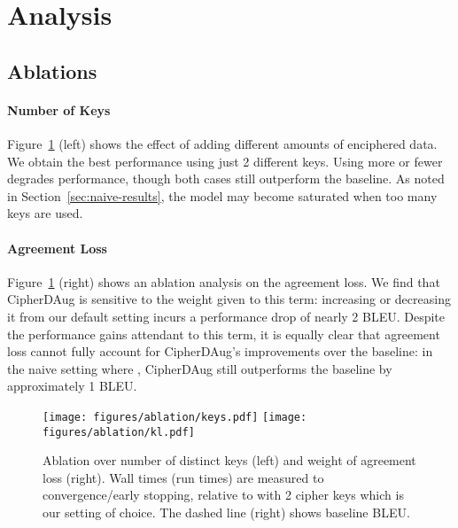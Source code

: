 \documentclass[11pt]{article}
\begin{document}
\section{Analysis}


\subsection{Ablations} 

\label{sec:ablation}
\paragraph{Number of Keys} Figure~\ref{fig:agreement-ablation} (left) shows the effect of adding different amounts of enciphered data. We obtain the best performance using just 2 different keys. Using more or fewer degrades performance, though both cases still outperform the baseline. 
As noted in Section~\ref{sec:naive-results}, the model may become saturated when too many keys are used.

\paragraph{Agreement Loss}
Figure~\ref{fig:agreement-ablation} (right) shows an ablation analysis on the agreement loss. We find that CipherDAug is sensitive to the weight  given to this term: increasing or decreasing it from our default setting  incurs a performance drop of nearly 2 BLEU. 
Despite the performance gains attendant to this term, it is equally clear that agreement loss cannot fully account for CipherDAug's improvements over the baseline: in the naive setting where , CipherDAug still outperforms the baseline by approximately 1 BLEU. 


\begin{figure}[!ht]
    \centering
    
    \texttt{[image: figures/ablation/keys.pdf]}
    \texttt{[image: figures/ablation/kl.pdf]}
\caption{Ablation over number of distinct keys (left) and weight  of agreement loss (right). Wall times (run times) are measured to convergence/early stopping, relative to  with 2 cipher keys which is our setting of choice. The dashed line (right) shows baseline BLEU.}
    \label{fig:agreement-ablation}
\end{figure}
\end{document}
